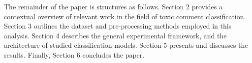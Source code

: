 The remainder of the paper is structures as follows. Section 2 provides a contextual overview of relevant work in the field of toxic comment classification. Section 3 outlines the dataset and pre-processing methods employed in this analysis. Section 4 describes the general experimental framework, and the architecture of studied classification models. Section 5 presents and discusses the results. Finally, Section 6 concludes the paper.












